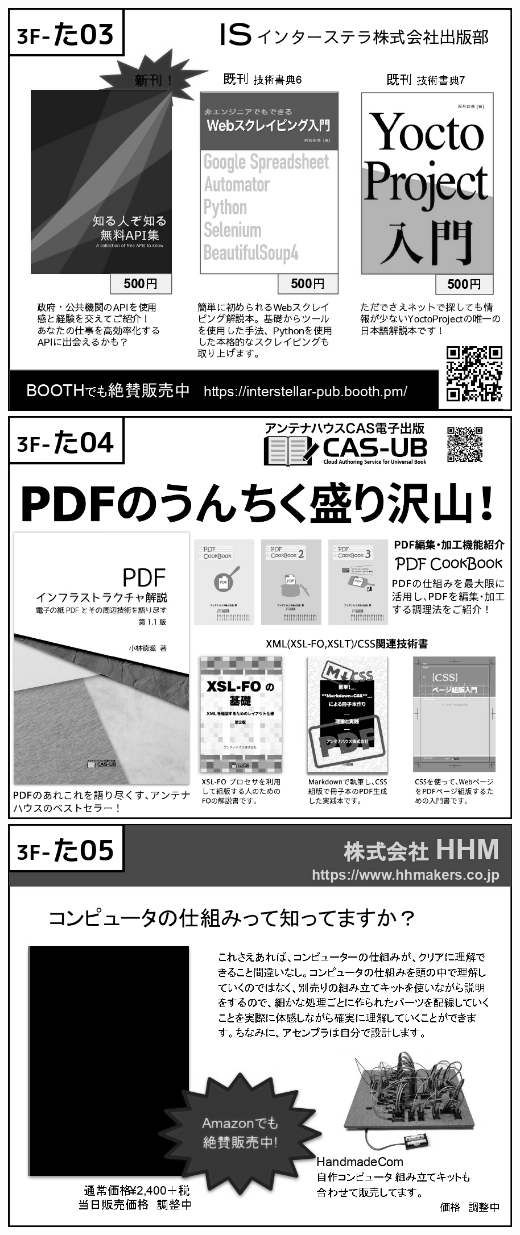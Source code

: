 \begin{center}
\includegraphics[width=0.9\linewidth]{images/circle-appeals/3F-た03.jpg}
\includegraphics[width=0.9\linewidth]{images/circle-appeals/3F-た04.jpg}
\includegraphics[width=0.9\linewidth]{images/circle-appeals/3F-た05.jpg}

\end{center}
